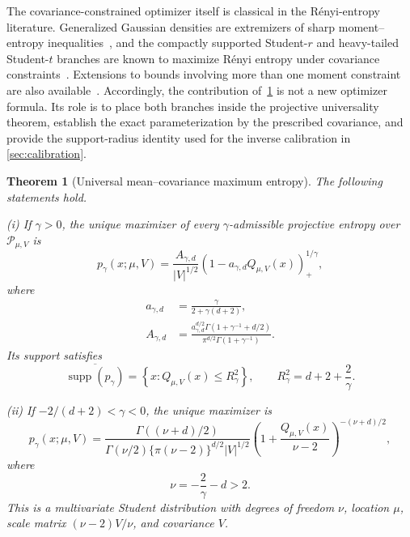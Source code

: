 \documentclass[pdflatex,sn-mathphys-num]{sn-jnl}
\theoremstyle{thmstyleone}
\newtheorem{theorem}{Theorem}
\theoremstyle{thmstyletwo}
\theoremstyle{thmstylethree}
\DeclareMathOperator{\supp}{supp}
\newcommand{\calP}{\mathcal{P}}
\begin{document}
The covariance-constrained optimizer itself is classical in the R\'enyi-entropy literature. Generalized Gaussian densities are extremizers of sharp moment--entropy inequalities~\citep{LutwakYangZhang2005}, and the compactly supported Student-$r$ and heavy-tailed Student-$t$ branches are known to maximize R\'enyi entropy under covariance constraints~\citep{JohnsonVignat2007}. Extensions to bounds involving more than one moment constraint are also available~\citep{Reeves2020}. Accordingly, the contribution of~\cref{thm:mean-cov} is not a new optimizer formula. Its role is to place both branches inside the projective universality theorem, establish the exact parameterization by the prescribed covariance, and provide the support-radius identity used for the inverse calibration in \cref{sec:calibration}.


\begin{theorem}[Universal mean--covariance maximum entropy]\label{thm:mean-cov}
The following statements hold.

\medskip
\noindent
(i) If $\gamma>0$, the unique maximizer of every $\gamma$-admissible projective entropy over $\calP_{\mu,V}$ is
\begin{equation}
 p_\gamma(x;\mu,V)
 =
 \frac{A_{\gamma,d}}{|V|^{1/2}}
 \left(1-a_{\gamma,d}Q_{\mu,V}(x)\right)_+^{1/\gamma},
\label{eq:qgaussian-positive}
\end{equation}
where
\begin{align}
 a_{\gamma,d}
 &=\frac{\gamma}{2+\gamma(d+2)},
\label{eq:a-positive}\\
 A_{\gamma,d}
 &=
 \frac{a_{\gamma,d}^{d/2}
 \Gamma(1+\gamma^{-1}+d/2)}
 {\pi^{d/2}\Gamma(1+\gamma^{-1})}.
\label{eq:A-positive}
\end{align}
Its support satisfies
\begin{equation}
 \overline{\supp(p_\gamma)}
 =
 \left\{x:Q_{\mu,V}(x)\leq R_\gamma^2\right\},
 \qquad
 R_\gamma^2=d+2+\frac{2}{\gamma}.
\label{eq:Rgamma}
\end{equation}

\medskip
\noindent
(ii) If $-2/(d+2)<\gamma<0$, the unique maximizer is
\begin{equation}
 p_\gamma(x;\mu,V)
 =
 \frac{\Gamma((\nu+d)/2)}
 {\Gamma(\nu/2)\{\pi(\nu-2)\}^{d/2}|V|^{1/2}}
 \left(1+\frac{Q_{\mu,V}(x)}{\nu-2}\right)^{-(\nu+d)/2},
\label{eq:student-branch}
\end{equation}
where
\begin{equation}
 \nu=-\frac{2}{\gamma}-d>2.
\label{eq:nu-gamma}
\end{equation}
This is a multivariate Student distribution with degrees of freedom $\nu$, location $\mu$, scale matrix $(\nu-2)V/\nu$, and covariance $V$.
\end{theorem}
\end{document}
